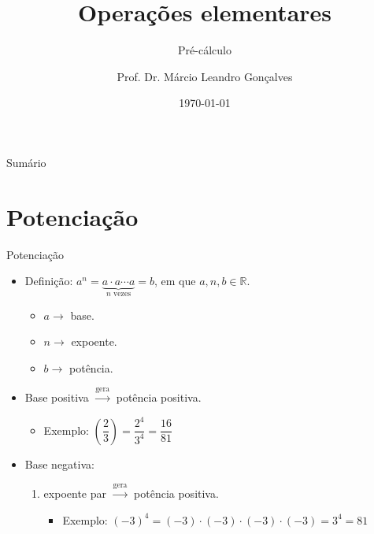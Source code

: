 \documentclass[14pt, aspectratio=169]{beamer}
\title{Operações elementares}
\subtitle{Pré-cálculo}
\author{Prof. Dr. Márcio Leandro Gonçalves}
\date{\today}
\institute{PUC Minas - Poços de Caldas}
\newcommand{\R}{\mathbb{R}}
\newcommand{\skipframe}{\vspace{10.0cm}}
\begin{document}
\begin{frame}
\maketitle 
\end{frame}

\begin{frame}{Sumário}
    \tableofcontents
\end{frame}

\section{Potenciação}

\begin{frame}[allowframebreaks]{Potenciação}

\begin{itemize}
    \item Definição: $a^n = \underbrace{a \cdot a \cdots a}_{n \text{ vezes}} = b$, em que $a, n, b \in \R$.
    \begin{itemize}
        \item $a \rightarrow$ base.
        \item $n \rightarrow$ expoente.
        \item $b \rightarrow$ potência.
    \end{itemize}

    \skipframe

    \item Base positiva $\xrightarrow{\text{gera}}$ potência positiva.

    \begin{itemize}
        \item Exemplo: $ \left( \dfrac{2}{3} \right) = \dfrac{2^4}{3^4} = \dfrac{16}{81}$
    \end{itemize}

    \skipframe

    \item Base negativa:

    \begin{enumerate}[a]
        \item expoente par $\xrightarrow{\text{gera}}$ potência positiva.

        \begin{itemize}
            \item Exemplo: $(-3)^4 = (-3) \cdot (-3) \cdot (-3) \cdot (-3) = 3^4 = 81$
        \end{itemize}
        

\end{enumerate}
\end{itemize}
\end{frame}
\end{document}
